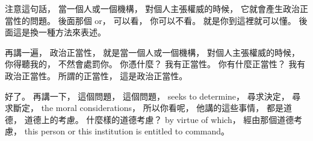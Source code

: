 \hypertarget{w02:cue:941}{}注意這句話，
\hypertarget{w02:cue:942}{}當一個人或一個機構，
\hypertarget{w02:cue:943}{}對個人主張權威的時候，
\hypertarget{w02:cue:944}{}它就會產生政治正當性的問題。
\hypertarget{w02:cue:945}{}後面那個 or，
\hypertarget{w02:cue:946}{}可以看，
\hypertarget{w02:cue:947}{}你可以不看。
\hypertarget{w02:cue:948}{}就是你到這裡就可以懂。
\hypertarget{w02:cue:949}{}後面這是換一種方法來表述。

\hypertarget{w02:cue:950}{}再講一遍，
\hypertarget{w02:cue:951}{}政治正當性，
\hypertarget{w02:cue:952}{}就是當一個人或一個機構，
\hypertarget{w02:cue:953}{}對個人主張權威的時候，
\hypertarget{w02:cue:954}{}你得聽我的，
\hypertarget{w02:cue:955}{}不然會處罰你。
\hypertarget{w02:cue:956}{}你憑什麼？
\hypertarget{w02:cue:957}{}我有正當性。
\hypertarget{w02:cue:958}{}你有什麼正當性？
\hypertarget{w02:cue:959}{}我有政治正當性。
\hypertarget{w02:cue:960}{}所謂的正當性，
\hypertarget{w02:cue:961}{}這是政治正當性。

\hypertarget{w02:cue:962}{}好了。
\hypertarget{w02:cue:963}{}再講一下，
\hypertarget{w02:cue:964}{}這個問題，
\hypertarget{w02:cue:965}{}這個問題，
\hypertarget{w02:cue:966}{}seeks to determine，
\hypertarget{w02:cue:967}{}尋求決定，
\hypertarget{w02:cue:968}{}尋求斷定，
\hypertarget{w02:cue:969}{}the moral considerations，
\hypertarget{w02:cue:970}{}所以你看呢，
\hypertarget{w02:cue:971}{}他講的這些事情，
\hypertarget{w02:cue:972}{}都是道德，
\hypertarget{w02:cue:973}{}道德上的考慮。
\hypertarget{w02:cue:974}{}什麼樣的道德考慮？
\hypertarget{w02:cue:975}{}by virtue of which，
\hypertarget{w02:cue:976}{}經由那個道德考慮，
\hypertarget{w02:cue:977}{}this person
\hypertarget{w02:cue:978}{}or this institution
\hypertarget{w02:cue:979}{}is entitled to command。

